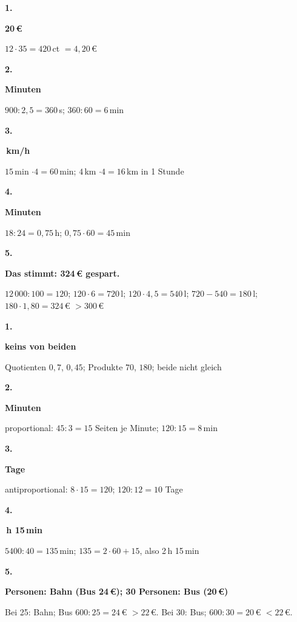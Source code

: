 \documentclass[11pt]{article}
\newcommand{\lsg}[3]{\par\noindent\begin{minipage}[t]{9mm}\textbf{#1}\end{minipage}%
  \begin{minipage}[t]{52mm}\raggedright\bfseries\boldmath #2\end{minipage}\hspace{3mm}%
  \begin{minipage}[t]{\dimexpr\linewidth-64mm\relax}\raggedright\small #3\end{minipage}\par\vspace{4pt}}
\begin{document}
\lsg{1.}{4{,}20\,€}{$12 \cdot 35 = 420$\,ct $= 4{,}20$\,€}
\lsg{2.}{6 Minuten}{$900 : 2{,}5 = 360$\,s; $360 : 60 = 6$\,min}
\lsg{3.}{16\,km/h}{$15$\,min $\cdot 4 = 60$\,min; $4$\,km $\cdot 4 = 16$\,km in 1 Stunde}
\lsg{4.}{45 Minuten}{$18 : 24 = 0{,}75$\,h; $0{,}75 \cdot 60 = 45$\,min}
\lsg{5.}{Das stimmt: 324\,€ gespart.}{$12\,000 : 100 = 120$; $120 \cdot 6 = 720$\,l; $120 \cdot 4{,}5 = 540$\,l; $720 - 540 = 180$\,l; $180 \cdot 1{,}80 = 324$\,€ $> 300$\,€}
\par\Needspace{25mm}\vspace{6pt}\noindent\colorbox{black!12}{}\hspace{2mm}{\bfseries Probetest}\par\vspace{4pt}
\lsg{1.}{keins von beiden}{Quotienten $0{,}7$, $0{,}45$; Produkte $70$, $180$; beide nicht gleich}
\lsg{2.}{8 Minuten}{proportional: $45 : 3 = 15$ Seiten je Minute; $120 : 15 = 8$\,min}
\lsg{3.}{10 Tage}{antiproportional: $8 \cdot 15 = 120$; $120 : 12 = 10$ Tage}
\lsg{4.}{2\,h 15\,min}{$5400 : 40 = 135$\,min; $135 = 2 \cdot 60 + 15$, also 2\,h 15\,min}
\lsg{5.}{25 Personen: Bahn (Bus 24\,€); 30 Personen: Bus (20\,€)}{Bei 25: Bahn; Bus $600 : 25 = 24$\,€ $> 22$\,€. Bei 30: Bus; $600 : 30 = 20$\,€ $< 22$\,€.}
\end{document}
